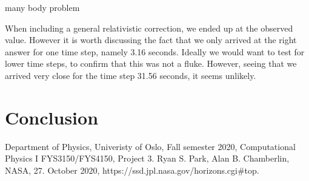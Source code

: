 \documentclass[reprint, english,notitlepage,nofootinbib]{revtex4-1}  %
\begin{document}
many body problem

When including a general relativistic correction, we ended up at the observed value. However it is worth discussing the fact that we only arrived at the right answer for one time step, namely 3.16 seconds. Ideally we would want to test for lower time steps, to confirm that this was not a fluke. However, seeing that we arrived very close for the time step 31.56 seconds, it seems unlikely.



\section{Conclusion}




\onecolumngrid
\vspace{1cm} %
\newpage

\begin{thebibliography}{}
 Department of Physics, Univeristy of Oslo, Fall semester 2020, Computational Physics I FYS3150/FYS4150, Project 3.
 Ryan S. Park, Alan B. Chamberlin, NASA, 27. October 2020, https://ssd.jpl.nasa.gov/horizons.cgi\#top.

\end{thebibliography}
\end{document}
